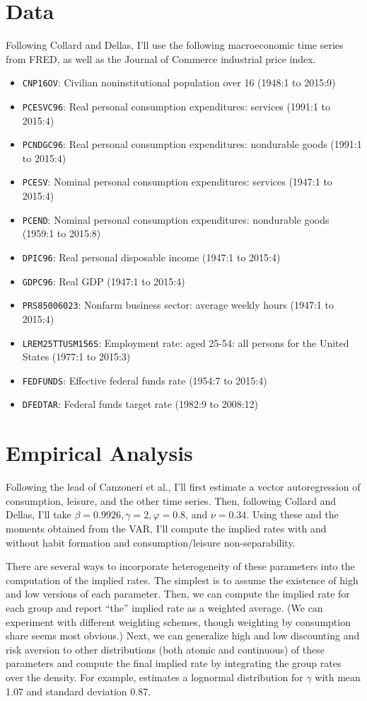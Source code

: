 \documentclass{hw}
\begin{document}
\section{Data}
Following Collard and Dellas, I'll use the following macroeconomic time series from FRED, as well as the Journal of Commerce industrial price index.
\begin{itemize}
\item \texttt{CNP16OV}: Civilian noninstitutional population over 16 (1948:1 to 2015:9)
\item \texttt{PCESVC96}: Real personal consumption expenditures: services (1991:1 to 2015:4)
\item \texttt{PCNDGC96}: Real personal consumption expenditures: nondurable goods (1991:1 to 2015:4)
\item \texttt{PCESV}: Nominal personal consumption expenditures: services (1947:1 to 2015:4)
\item \texttt{PCEND}: Nominal personal consumption expenditures: nondurable goods (1959:1 to 2015:8)
\item \texttt{DPIC96}: Real personal disposable income (1947:1 to 2015:4)
\item \texttt{GDPC96}: Real GDP (1947:1 to 2015:4)
\item \texttt{PRS85006023}: Nonfarm business sector: average weekly hours (1947:1 to 2015:4)
\item \texttt{LREM25TTUSM156S}: Employment rate: aged 25-54: all persons for the United States (1977:1 to 2015:3)
\item \texttt{FEDFUNDS}: Effective federal funds rate (1954:7 to 2015:4)
\item \texttt{DFEDTAR}: Federal funds target rate (1982:9 to 2008:12)
\end{itemize}

\section{Empirical Analysis}
Following the lead of Canzoneri et al., I'll first estimate a vector autoregression of consumption, leisure, and the other time series. Then, following Collard and Dellas, I'll take $\beta = 0.9926, \gamma = 2, \varphi = 0.8$, and $\nu = 0.34$. Using these and the moments obtained from the VAR, I'll compute the implied rates with and without habit formation and consumption/leisure non-separability.

There are several ways to incorporate heterogeneity of these parameters into the computation of the implied rates. The simplest is to assume the existence of high and low versions of each parameter. Then, we can compute the implied rate for each group and report ``the'' implied rate as a weighted average. (We can experiment with different weighting schemes, though weighting by consumption share seems most obvious.) Next, we can generalize high and low discounting and risk aversion to other distributions (both atomic and continuous) of these parameters and compute the final implied rate by integrating the group rates over the density. For example, \cite{cozzi14} estimates a lognormal distribution for $\gamma$ with mean 1.07 and standard deviation 0.87.
\end{document}
